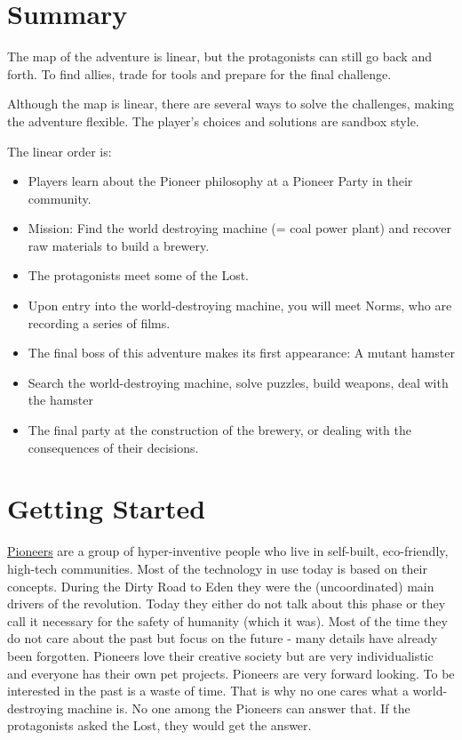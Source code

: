 \section{Summary}

The map of the adventure is linear, but the protagonists can still go back and forth. To find allies, trade for tools and prepare for the final challenge.

Although the map is linear, there are several ways to solve the challenges, making the adventure flexible. The player's choices and solutions are sandbox style.

The linear order is:

\begin{itemize}
\item Players learn about the Pioneer philosophy at a Pioneer Party in their community.
\item Mission: Find the world destroying machine (= coal power plant) and recover raw materials to build a brewery.
\item The protagonists meet some of the Lost.
\item Upon entry into the world-destroying machine, you will meet Norms, who are recording a series of films.
\item The final boss of this adventure makes its first appearance: A mutant hamster
\item Search the world-destroying machine, solve puzzles, build weapons, deal with the hamster
\item The final party at the construction of the brewery, or dealing with the consequences of their decisions.
\end{itemize}

\section{Getting Started}

\begin{sidebarBox}[title=Pioneers]
\hyperref[sec:Pioneers]{Pioneers} are a group of hyper-inventive people who live in self-built, eco-friendly, high-tech communities. Most of the technology in use today is based on their concepts. During the Dirty Road to Eden they were the (uncoordinated) main drivers of the revolution. Today they either do not talk about this phase or they call it necessary for the safety of humanity (which it was). Most of the time they do not care about the past but focus on the future - many details have already been forgotten. Pioneers love their creative society but are very individualistic and everyone has their own pet projects.
Pioneers are very forward looking. To be interested in the past is a waste of time. That is why no one cares what a world-destroying machine is. No one among the Pioneers can answer that. If the protagonists asked the Lost, they would get the answer.
\end{sidebarBox}

